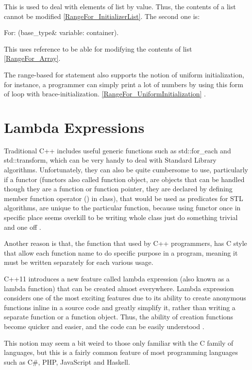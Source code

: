 \documentclass[11pt]{report}
\begin{document}
This is used to deal with elements of list by value. Thus, the contents of a list cannot be modified \ref{RangeFor_InitializerList}. The second one is:
\begin{center}
For: (base\_type\& variable: container).
\end{center}

This uses reference to be able for modifying the contents of list \ref{RangeFor_Array}.


The range-based for statement also supports the notion of uniform initialization, for instance, a programmer can simply print a lot of numbers by using this form of loop with brace-initialization. \ref{RangeFor_UniformInitialization} \cite{Overland:2011:CWF}.

\section{Lambda Expressions}
\label{section: Lambda Expressions}
Traditional C++ includes useful generic functions such as std::for\_each and std::transform, which can be very handy to deal with Standard Library algorithms.  Unfortunately, they can also be quite cumbersome to use, particularly if a functor (functors also called function object, are objects that can be handled though they are a function or function pointer, they are declared by defining member function operator () in class), that would be used as predicates for STL algorithms, are unique to the particular function, because using functor once in specific place seems overkill to be writing whole class just do something trivial and one off \cite{Allain:2011:FutureCpp}. 


Another reason is that, the function that used by C++ programmers, has C style that  allow each function name to do specific purpose in a program, meaning it must be written separately for each various usage.


C++11 introduces a new feature called lambda expression (also known as a lambda function) that can be created almost everywhere. Lambda expression considers one of the most exciting features due to its ability to create anonymous functions inline in a source code and greatly simplify it, rather than writing a separate function or a function object.  Thus, the ability of creation functions become quicker and easier, and the code can be easily understood \cite{Gregorie:professionalcpp}.


This notion may seem a bit weird to those only familiar with the C family of languages, but this is a fairly common feature of most programming languages such as C\#, PHP, JavaScript and Haskell.  
\end{document}
